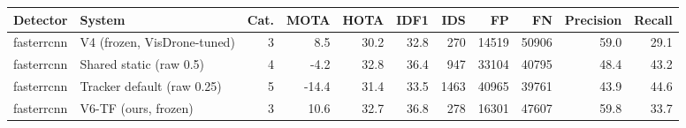\begin{tabular}{llrrrrrrrrr}
\toprule
Detector & System & Cat. & MOTA & HOTA & IDF1 & IDS & FP & FN & Precision & Recall \\
\midrule
fasterrcnn & V4 (frozen, VisDrone-tuned) & 3 & 8.5 & 30.2 & 32.8 & 270 & 14519 & 50906 & 59.0 & 29.1 \\
fasterrcnn & Shared static (raw 0.5) & 4 & -4.2 & 32.8 & 36.4 & 947 & 33104 & 40795 & 48.4 & 43.2 \\
fasterrcnn & Tracker default (raw 0.25) & 5 & -14.4 & 31.4 & 33.5 & 1463 & 40965 & 39761 & 43.9 & 44.6 \\
fasterrcnn & V6-TF (ours, frozen) & 3 & 10.6 & 32.7 & 36.8 & 278 & 16301 & 47607 & 59.8 & 33.7 \\
\bottomrule
\end{tabular}
